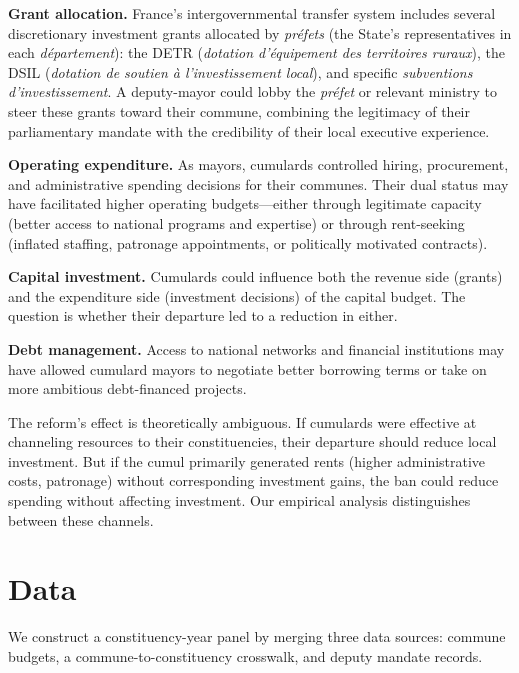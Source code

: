 \documentclass[12pt]{article}
\begin{document}
\textbf{Grant allocation.} France's intergovernmental transfer system includes several discretionary investment grants allocated by \textit{préfets} (the State's representatives in each \textit{département}): the DETR (\textit{dotation d'équipement des territoires ruraux}), the DSIL (\textit{dotation de soutien à l'investissement local}), and specific \textit{subventions d'investissement}. A deputy-mayor could lobby the \textit{préfet} or relevant ministry to steer these grants toward their commune, combining the legitimacy of their parliamentary mandate with the credibility of their local executive experience.

\textbf{Operating expenditure.} As mayors, cumulards controlled hiring, procurement, and administrative spending decisions for their communes. Their dual status may have facilitated higher operating budgets---either through legitimate capacity (better access to national programs and expertise) or through rent-seeking (inflated staffing, patronage appointments, or politically motivated contracts).

\textbf{Capital investment.} Cumulards could influence both the revenue side (grants) and the expenditure side (investment decisions) of the capital budget. The question is whether their departure led to a reduction in either.

\textbf{Debt management.} Access to national networks and financial institutions may have allowed cumulard mayors to negotiate better borrowing terms or take on more ambitious debt-financed projects.

The reform's effect is theoretically ambiguous. If cumulards were effective at channeling resources to their constituencies, their departure should reduce local investment. But if the cumul primarily generated rents (higher administrative costs, patronage) without corresponding investment gains, the ban could reduce spending without affecting investment. Our empirical analysis distinguishes between these channels.


\section{Data}\label{sec:data}

We construct a constituency-year panel by merging three data sources: commune budgets, a commune-to-constituency crosswalk, and deputy mandate records.
\end{document}
